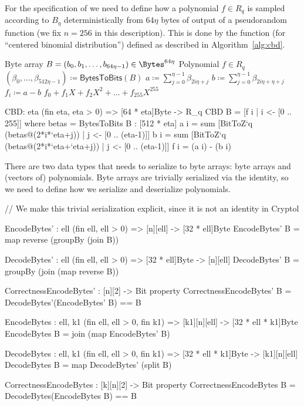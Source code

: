For the specification of \Kyber we need to define how a polynomial $f \in R_q$ 
is sampled according to $B_\eta$ deterministically from $64\eta$ bytes of output of a
pseudorandom function (we fix $n=256$ in this description). 
This is done by the function \CBD (for ``centered binomial distribution'')
defined as described in Algorithm~\ref{alg:cbd}.

\begin{algorithm}
  \caption{$\CBD_{\eta}\colon\Bytes^{64\eta} \rightarrow R_q$
  }
  \label{alg:cbd}
  \begin{algorithmic}
    \Require Byte array $B = (b_0, b_1, \dots ,b_{64\eta-1}) \in \Bytes^{64\eta}$ 
    \Ensure Polynomial $f \in R_q$
    \State $(\beta_0,\dots,\beta_{512\eta-1}) \coloneqq \mathsf{BytesToBits}(B)$
      \State $a \coloneqq \sum_{j=0}^{\eta-1}\beta_{2i\eta+j}$
      \State $b \coloneqq \sum_{j=0}^{\eta-1}\beta_{2i\eta+\eta+j}$
      \State $f_i \coloneqq a-b$
    \EndFor
    \State \Return $f_0 + f_1X + f_2X^2 + \dots + f_{255}X^{255}$
  \end{algorithmic}
\end{algorithm}

\begin{code}
  CBD: {eta} (fin eta, eta > 0) => [64 * eta]Byte -> R_q
  CBD B = [f i | i <- [0 .. 255]]
      where betas = BytesToBits B : [512 * eta]
            a i = sum [BitToZ`{q} (betas@(2*i*`eta+j)) | j <- [0 .. (eta-1)]]
            b i = sum [BitToZ`{q} (betas@(2*i*`eta+`eta+j)) | j <- [0 .. (eta-1)]]
            f i = (a i) - (b i)
\end{code}

There are two data types that \Kyber needs to serialize to byte arrays:
byte arrays and (vectors of) polynomials. Byte arrays are trivially serialized
via the identity, so we need to define how we serialize and deserialize polynomials.

\begin{code}
  // We make this trivial serialization explicit, since it is not an identity in Cryptol

  EncodeBytes' : {ell} (fin ell, ell > 0) => [n][ell] -> [32 * ell]Byte
  EncodeBytes' B = map reverse (groupBy (join B))

  DecodeBytes' : {ell} (fin ell, ell > 0) => [32 * ell]Byte -> [n][ell]
  DecodeBytes' B = groupBy (join (map reverse B))
  
  CorrectnessEncodeBytes' : [n][2] -> Bit
  property CorrectnessEncodeBytes' B = DecodeBytes'(EncodeBytes' B) == B
  
  EncodeBytes : {ell, k1} (fin ell, ell > 0, fin k1) =>
      [k1][n][ell] -> [32 * ell * k1]Byte
  EncodeBytes B = join (map EncodeBytes' B)
  
  DecodeBytes : {ell, k1} (fin ell, ell > 0, fin k1) =>
      [32 * ell * k1]Byte -> [k1][n][ell]
  DecodeBytes B = map DecodeBytes' (split B)
  
  CorrectnessEncodeBytes : [k][n][2] -> Bit
  property CorrectnessEncodeBytes B = DecodeBytes(EncodeBytes B) == B
\end{code}

